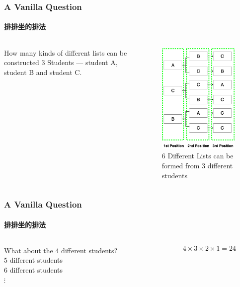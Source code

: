 \documentclass[
	11pt, %
	handout,
]{beamer}
\begin{document}
\begin{frame}
	\frametitle{A Vanilla Question} %
	\framesubtitle{排排坐的排法}
	\begin{columns}[t] 
		\begin{column}{0.3\textwidth} %
			How many kinds of different lists can be constructed 3 Students --- student A, student B and student C.  
		\end{column}
		\begin{column}{0.7\textwidth} %
		  \pause
			\begin{figure}
				\includegraphics[width=0.5\linewidth]{Permutation3.png}
				\caption{6 Different Lists can be formed from 3 different students}
			\end{figure}
		\end{column}
	\end{columns}
\end{frame}



\begin{frame}
	\frametitle{A Vanilla Question} %
	\framesubtitle{排排坐的排法}
	\begin{columns}[t] 
		\begin{column}{0.3\textwidth} %
		   What about the 4 different students?\\
		   5 different students\\
		   6 different students\\
		   $\vdots$

		\end{column}
		\begin{column}{0.7\textwidth} %
		  \pause
		  \begin{equation*}
		  		  	4 \times 3 \times 2 \times 1 = 24 
		  \end{equation*}
		\end{column}
	\end{columns}
\end{frame}
\end{document}
